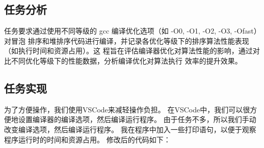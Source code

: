\documentclass[UTF8]{ctexart}
\begin{document}
\subsection{任务分析}
任务要求通过使用不同等级的 gcc 编译优化选项（如 -O0, -O1, -O2, -O3, -Ofast）对冒泡
排序和堆排序代码进行编译，并记录各优化等级下的排序算法性能表现（如执行时间和资源占用）。这
程旨在评估编译器优化对算法性能的影响，通过对比不同优化等级下的性能数据，分析编译优化对算法执行
效率的提升效果。

\subsection{任务实现}
为了方便操作，我们使用VSCode来减轻操作负担。
在VSCode中，我们可以很方便地设置编译器的编译选项，然后编译运行程序。
由于任务不多，所以我们手动改变编译选项，然后编译运行程序。
我在程序中加入一些打印语句，以便于观察程序运行时的时间和资源占用。
修改后的代码如下：
\end{document}
